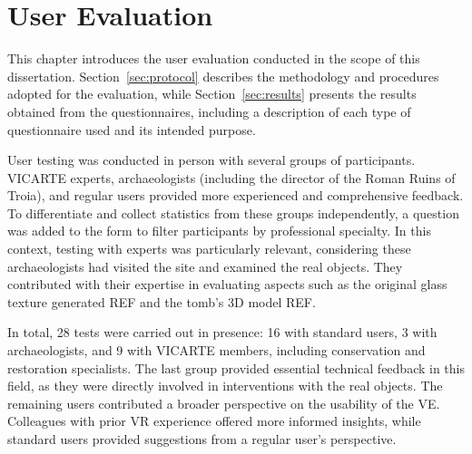 
%

\chapter{User Evaluation}
\label{cha:user_evaluation}
\setlength{\parskip}{0pt} 

This chapter introduces the user evaluation conducted in the scope of this dissertation. 
Section~\ref{sec:protocol} describes the methodology and procedures adopted for the evaluation, while Section~\ref{sec:results} presents the results obtained from the questionnaires, including a description of each type of questionnaire used and its intended purpose.

User testing was conducted in person with several groups of participants. \gls{VICARTE} experts, archaeologists (including the director of the Roman Ruins of Troia), and regular users provided more experienced and comprehensive feedback.
To differentiate and collect statistics from these groups independently, a question was added to the form to filter participants by professional specialty.
In this context, testing with experts was particularly relevant, considering these archaeologists had visited the site and examined the real objects. They contributed with their expertise in evaluating aspects such as the original glass texture generated REF and the tomb’s \gls{3D} model REF.

In total, 28 tests were carried out in presence: 16 with standard users, 3 with archaeologists, and 9 with \gls{VICARTE} members, including conservation and restoration specialists. The last group provided essential technical feedback in this field, as they were directly involved in interventions with the real objects.
The remaining users contributed a broader perspective on the usability of the \gls{VE}. Colleagues with prior \gls{VR} experience offered more informed insights, while standard users provided suggestions from a regular user’s perspective.


